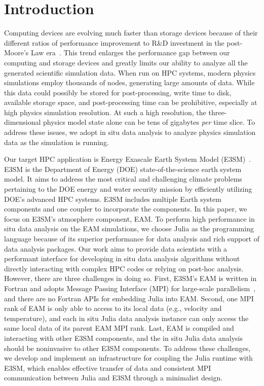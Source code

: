 \documentclass{juliacon}
\begin{document}
\section{Introduction}

Computing devices are evolving much faster than storage devices because of their different ratios of performance improvement to R\&D investment in the post-Moore’s Law era~\cite{thompson2018decline}. This trend enlarges the performance gap between our computing and storage devices and greatly limits our ability to analyze all the generated scientific simulation data. When run on HPC systems, modern physics simulations employ thousands of nodes, generating large amounts of data. While this data could possibly be stored for post-processing, write time to disk, available storage space, and post-processing time can be prohibitive, especially at high physics simulation resolution.  At such a high resolution, the three-dimensional physics model state alone can be tens of gigabytes \emph{per} time slice. To address these issues, we adopt in situ data analysis to analyze physics simulation data as the simulation is running. 


Our target HPC application is Energy Exascale Earth System Model (E3SM)~\cite{golaz2019doe}. E3SM is the Department of Energy (DOE) state-of-the-science earth system model. It aims to address the most critical and challenging climate problems pertaining to the DOE energy and water security mission by efficiently utilizing DOE’s advanced HPC systems. E3SM includes multiple Earth system components and one coupler to incorporate the components. In this paper, we focus on E3SM's atmosphere component, EAM. To perform high performance in situ data analysis on the EAM simulations, we choose Julia as the programming language because of its superior performance for data analysis and rich support of data analysis packages. Our work aims to provide data scientists with a performant interface for developing in situ data analysis algorithms without directly interacting with complex HPC codes or relying on post-hoc analysis. However, there are three challenges in doing so. First, E3SM's EAM is written in Fortran and adopts Message Passing Interface (MPI) for large-scale parallelism~\cite{walker1996mpi}, and there are no Fortran APIs for embedding Julia into EAM. Second, one MPI rank of EAM is only able to access to its local data (e.g., velocity and temperature), and each in situ Julia data analysis instance can only access the same local data of its parent EAM MPI rank. Last, EAM is compiled and interacting with other E3SM components, and the in situ Julia data analysis should be noninvasive to other E3SM components. To address these challenges, we develop and implement an infrastructure for coupling the Julia runtime with E3SM, which enables effective transfer of data and consistent MPI communication between Julia and E3SM through a minimalist design. 
\end{document}
